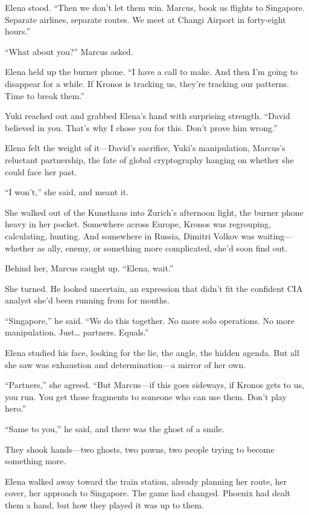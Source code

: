 Elena stood. ``Then we don't let them win. Marcus, book us flights to
Singapore. Separate airlines, separate routes. We meet at Changi Airport
in forty-eight hours.''

``What about you?'' Marcus asked.

Elena held up the burner phone. ``I have a call to make. And then I'm
going to disappear for a while. If Kronos is tracking us, they're
tracking our patterns. Time to break them.''

Yuki reached out and grabbed Elena's hand with surprising strength.
``David believed in you. That's why I chose you for this. Don't prove
him wrong.''

Elena felt the weight of it---David's sacrifice, Yuki's manipulation,
Marcus's reluctant partnership, the fate of global cryptography hanging
on whether she could face her past.

``I won't,'' she said, and meant it.

She walked out of the Kunsthaus into Zurich's afternoon light, the
burner phone heavy in her pocket. Somewhere across Europe, Kronos was
regrouping, calculating, hunting. And somewhere in Russia, Dimitri
Volkov was waiting---whether as ally, enemy, or something more
complicated, she'd soon find out.

Behind her, Marcus caught up. ``Elena, wait.''

She turned. He looked uncertain, an expression that didn't fit the
confident CIA analyst she'd been running from for months.

``Singapore,'' he said. ``We do this together. No more solo operations.
No more manipulation. Just\ldots{} partners. Equals.''

Elena studied his face, looking for the lie, the angle, the hidden
agenda. But all she saw was exhaustion and determination---a mirror of
her own.

``Partners,'' she agreed. ``But Marcus---if this goes sideways, if
Kronos gets to us, you run. You get those fragments to someone who can
use them. Don't play hero.''

``Same to you,'' he said, and there was the ghost of a smile.

They shook hands---two ghosts, two pawns, two people trying to become
something more.

Elena walked away toward the train station, already planning her route,
her cover, her approach to Singapore. The game had changed. Phoenix had
dealt them a hand, but how they played it was up to them.

